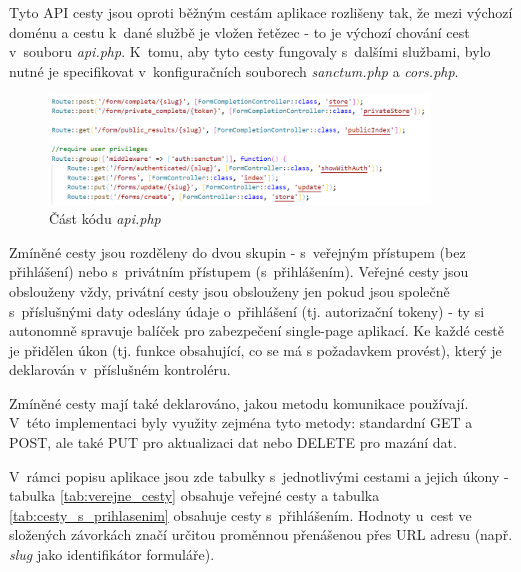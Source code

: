 	Tyto API cesty jsou oproti běžným cestám aplikace rozlišeny tak, že mezi výchozí doménu a cestu k~dané službě je vložen řetězec \textit{} - to je výchozí chování cest v~souboru \textit{api.php}. K~tomu, aby tyto cesty fungovaly s~dalšími službami, bylo nutné je specifikovat v~konfiguračních souborech \textit{sanctum.php} a \textit{cors.php}.
	
	\begin{figure}[H]
		\centering %
		\includegraphics[width=0.9\textwidth]{img/routes/api_routes.png} %
		\caption{Část kódu \textit{api.php}} %
		\label{fig:routes_api} %
	\end{figure}
	
	Zmíněné cesty jsou rozděleny do dvou skupin - s~veřejným přístupem (bez přihlášení) nebo s~privátním přístupem (s~přihlášením). Veřejné cesty jsou obslouženy vždy, privátní cesty jsou obslouženy jen pokud jsou společně s~příslušnými daty odeslány údaje o~přihlášení (tj. autorizační tokeny) - ty si autonomně spravuje balíček  pro zabezpečení single-page aplikací. Ke každé cestě je přidělen úkon (tj. funkce obsahující, co se má s požadavkem provést), který je deklarován v~příslušném kontroléru. 
	
	Zmíněné cesty mají také deklarováno, jakou metodu komunikace používají. V~této implementaci byly využity zejména tyto metody: standardní GET a POST, ale také PUT pro aktualizaci dat nebo DELETE pro mazání dat.
	
	V~rámci popisu aplikace jsou zde tabulky s~jednotlivými cestami a jejich úkony - tabulka \ref{tab:verejne_cesty} obsahuje veřejné cesty a tabulka \ref{tab:cesty_s_prihlasenim} obsahuje cesty s~přihlášením. Hodnoty u~cest ve složených závorkách značí určitou proměnnou přenášenou přes URL adresu (např. \textit{slug} jako identifikátor formuláře).
	
